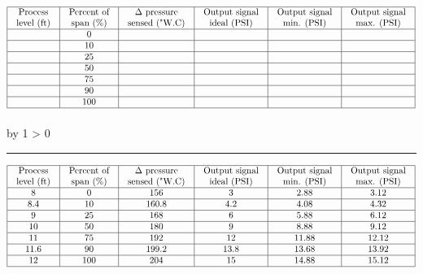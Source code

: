 \documentclass[12pt,a4paper]{article}
\def\svar{
           \advance\answnum by 1
           \ifnum \answnum > 0
                \hrule
                \vskip 3pt
                \leftline{Svar \the\answnum}
                \vskip 3pt \fi}
\begin{document}

$$\vbox{\offinterlineskip
\halign{\strut
\vrule \quad\hfil # \ \hfil & 
\vrule \quad\hfil # \ \hfil & 
\vrule \quad\hfil # \ \hfil & 
\vrule \quad\hfil # \ \hfil & 
\vrule \quad\hfil # \ \hfil & 
\vrule \quad\hfil # \ \hfil \vrule \cr
\noalign{\hrule}
%
Process & Percent of & $\Delta$ pressure & Output signal & Output signal & Output signal \cr
%
level (ft) & span (\%) & sensed ("W.C) & ideal (PSI) & min. (PSI) & max. (PSI) \cr
%
\noalign{\hrule}
%
  & 0 &  &  &  &  \cr
%
\noalign{\hrule}
%
  & 10 &  &  &  &  \cr
%
\noalign{\hrule}
%
  & 25 &  &  &  &  \cr
%
\noalign{\hrule}
%
  & 50 &  &  &  &  \cr
%
\noalign{\hrule}
%
  & 75 &  &  &  &  \cr
%
\noalign{\hrule}
%
  & 90 &  &  &  &  \cr
%
\noalign{\hrule}
%
  & 100 &  &  &  &  \cr
%
\noalign{\hrule}
} %
}$$ %

\vskip 10pt \filbreak 





\svar{} 


$$\vbox{\offinterlineskip
\halign{\strut
\vrule \quad\hfil # \ \hfil & 
\vrule \quad\hfil # \ \hfil & 
\vrule \quad\hfil # \ \hfil & 
\vrule \quad\hfil # \ \hfil & 
\vrule \quad\hfil # \ \hfil & 
\vrule \quad\hfil # \ \hfil \vrule \cr
\noalign{\hrule}
%
Process & Percent of & $\Delta$ pressure & Output signal & Output signal & Output signal \cr
%
level (ft) & span (\%) & sensed ("W.C) & ideal (PSI) & min. (PSI) & max. (PSI) \cr
%
\noalign{\hrule}
%
8 & 0 & 156 & 3 & 2.88 & 3.12 \cr
%
\noalign{\hrule}
%
8.4 & 10 & 160.8 & 4.2 & 4.08 & 4.32 \cr
%
\noalign{\hrule}
%
9 & 25 & 168 & 6 & 5.88 & 6.12 \cr
%
\noalign{\hrule}
%
10 & 50 & 180 & 9 & 8.88 & 9.12 \cr
%
\noalign{\hrule}
%
11 & 75 & 192 & 12 & 11.88 & 12.12 \cr
%
\noalign{\hrule}
%
11.6 & 90 & 199.2 & 13.8 & 13.68 & 13.92 \cr
%
\noalign{\hrule}
%
12 & 100 & 204 & 15 & 14.88 & 15.12 \cr
%
\noalign{\hrule}
} %
}$$ %

\vskip 10pt \filbreak 
\end{document}
